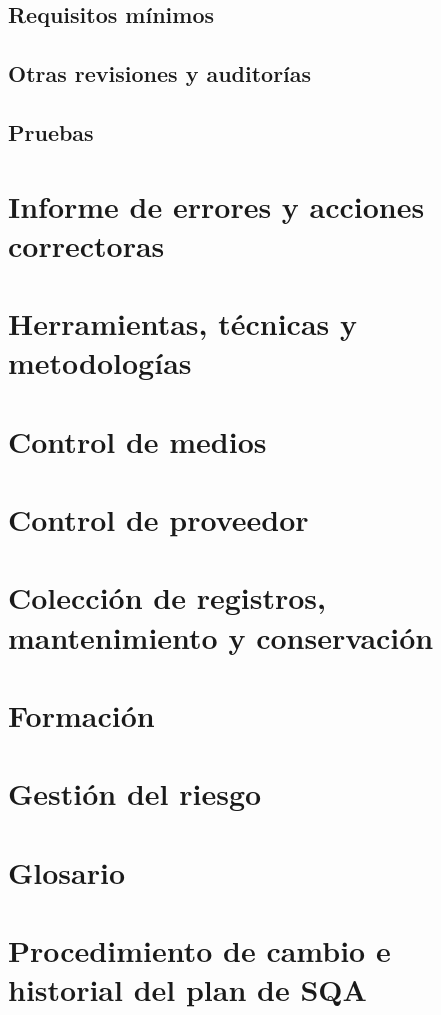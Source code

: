 \documentclass[11pt, a4paper, twoside, titlepage]{article}
\begin{document}
		\subsection{Requisitos mínimos}
		\subsection{Otras revisiones y auditorías}
		\subsection{Pruebas}
	\section{Informe de errores y acciones correctoras}
	\section{Herramientas, técnicas y metodologías}
	\section{Control de medios}
	\section{Control de proveedor}
	\section{Colección de registros, mantenimiento y conservación}
	\section{Formación}
	\section{Gestión del riesgo}
	\section{Glosario}
		\printglossaries
	\section{Procedimiento de cambio e historial del plan de SQA}


	\newpage
	
	
\end{document}
